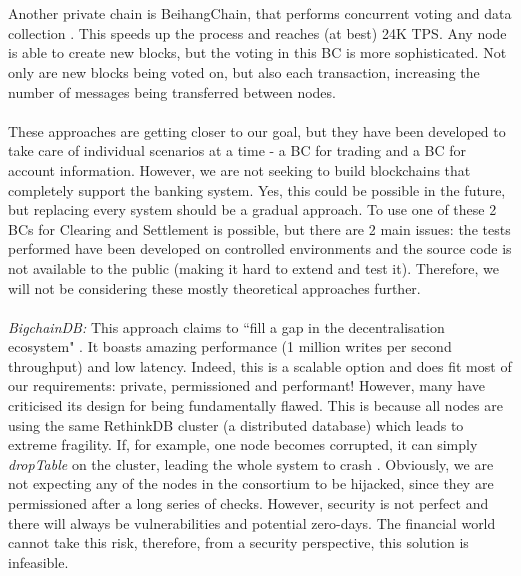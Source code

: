 \documentclass[12pt,twoside]{article}
\begin{document}
\\ \\
Another private chain is BeihangChain, that performs concurrent voting and data collection \cite{Chinese}. This speeds up the process and reaches (at best) 24K TPS. Any node is able to create new blocks, but the voting in this BC is more sophisticated. Not only are new blocks being voted on, but also each transaction, increasing the number of messages being transferred between nodes.
\\ \\
These approaches are getting closer to our goal, but they have been developed to take care of individual scenarios at a time - a BC for trading and a BC for account information. However, we are not seeking to build blockchains that completely support the banking system. Yes, this could be possible in the future, but replacing every system should be a gradual approach. To use one of these 2 BCs for Clearing and Settlement is possible, but there are 2 main issues: the tests performed have been developed on controlled environments and the source code is not available to the public (making it hard to extend and test it). Therefore, we will not be considering these mostly theoretical approaches further.
\\ \\
\textit{BigchainDB:} This approach claims to ``fill a gap in the decentralisation ecosystem" \cite{DBC}. It boasts amazing performance (1 million writes per second throughput) and low latency. Indeed, this is a scalable option and does fit most of our requirements: private, permissioned and performant! However, many have criticised its design for being fundamentally flawed. This is because all nodes are using the same RethinkDB cluster (a distributed database) which leads to extreme fragility. If, for example, one node becomes corrupted, it can simply \textit{dropTable} on the cluster, leading the whole system to crash \cite{Sewer}. Obviously, we are not expecting any of the nodes in the consortium to be hijacked, since they are permissioned after a long series of checks. However, security is not perfect and there will always be vulnerabilities and potential zero-days. The financial world cannot take this risk, therefore, from a security perspective, this solution is infeasible.
\end{document}
